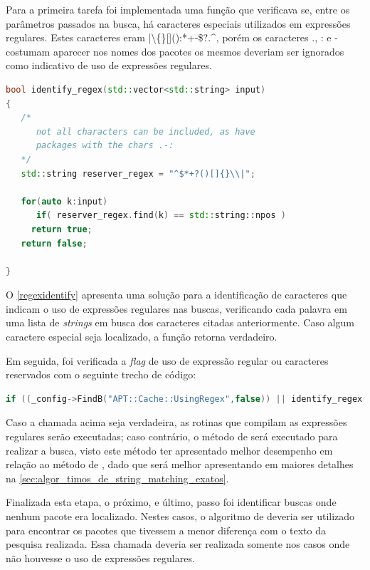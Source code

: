 Para a primeira tarefa foi implementada uma função que verificava se, entre os parâmetros passados na busca, há caracteres especiais utilizados em expressões regulares. Estes caracteres eram {\code |\textbackslash\{\}[]():*+-\$?.\^{}}, porém os caracteres {\code .}, {\code :} e {\code -} costumam aparecer nos nomes dos pacotes os mesmos deveriam ser ignorados como indicativo de uso de expressões regulares.

\begin{lstlisting}[language=C++,label=regexidentify,caption={Identificação de Expressões Regulares}]
bool identify_regex(std::vector<std::string> input)
{
   /*
      not all characters can be included, as have
      packages with the chars .-:
   */
   std::string reserver_regex = "^$*+?()[]{}\\|";

   for(auto k:input)
      if( reserver_regex.find(k) == std::string::npos )
	 return true;
   return false;

}
\end{lstlisting}

O \autoref{regexidentify} apresenta uma solução para a identificação de caracteres que indicam o uso de expressões regulares nas buscas, verificando cada palavra em uma lista de \textit{strings} em busca dos caracteres citadas anteriormente. Caso algum caractere especial seja localizado, a função retorna verdadeiro.


Em seguida, foi verificada a \textit{flag} de uso de expressão regular ou caracteres reservados com o seguinte trecho de código:

\begin{lstlisting}[language=C++,basicstyle=\footnotesize\ttfamily,numbers=none]
if ((_config->FindB("APT::Cache::UsingRegex",false)) || identify_regex(args))
\end{lstlisting}

Caso a chamada acima seja verdadeira, as rotinas que compilam as expressões regulares serão executadas; caso contrário, o método de  será executado para realizar a busca, visto este método ter apresentado melhor desempenho em relação ao método de , dado que será melhor apresentando em maiores detalhes na \autoref{sec:algor_timos_de_string_matching_exatos}.


Finalizada esta etapa, o próximo, e último, passo foi identificar buscas onde nenhum pacote era localizado. Nestes casos, o algoritmo de \textit{} deveria ser utilizado para encontrar os pacotes que tivessem a menor diferença com o texto da pesquisa realizada. Essa chamada deveria ser realizada somente nos casos onde não houvesse o uso de expressões regulares.

